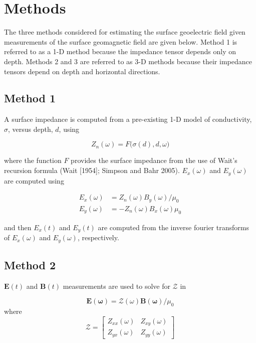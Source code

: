 \documentclass[12pt]{article}
\begin{document}
\section{Methods}

The three methods considered for estimating the surface geoelectric field given measurements of the surface geomagnetic field are given below.  Method 1 is referred to as a 1-D method because the impedance tensor depends only on depth.  Methods 2 and 3 are referred to as 3-D methods because their impedance tensors depend on depth and horizontal directions.

\subsection{Method 1}

A surface impedance is computed from a pre-existing 1-D model of conductivity, $\sigma$, versus depth, $d$, using

\begin{equation}
Z_{n}(\omega) = F\big(\sigma(d),d,\omega\big)
\end{equation}

\noindent where the function $F$ provides the surface impedance from the use of Wait's recursion formula (Wait [1954]; Simpson and Bahr 2005). $E_x(\omega)$ and $E_y(\omega)$ are computed using

\begin{equation}
\begin{split}
E_x(\omega) & = Z_n(\omega)B_y(\omega)/\mu_0\\
E_y(\omega) & = -Z_n(\omega)B_x(\omega)\mu_0
\end{split}
\end{equation}

\noindent and then $E_x(t)$ and $E_y(t)$ are computed from the inverse fourier transforms of $E_x(\omega)$ and $E_y(\omega)$, respectively.

\subsection{Method 2}

$\mathbf{E}(t)$ and $\mathbf{B}(t)$ measurements are used to solve for $\mathcal{Z}$ in

\begin{equation}
\mathbf{E(\omega)} = \mathcal{Z(\omega)}\mathbf{B(\omega)}/\mu_0
\end{equation}
\noindent where
\begin{equation}
\mathcal{Z} = 
\begin{bmatrix}
Z_{xx}(\omega) & Z_{xy}(\omega)\\
Z_{yx}(\omega) & Z_{yy}(\omega)
\end{bmatrix}
\end{equation}
\end{document}
